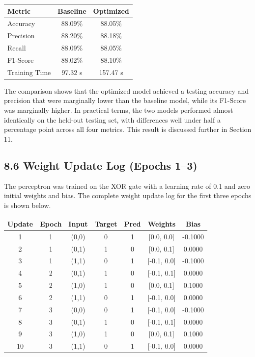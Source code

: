 \documentclass[11pt,a4paper]{article}
\begin{document}
\begin{center}
\begin{tabular}{|p{4cm}|c|c|}
\hline
\textbf{Metric} & \textbf{Baseline} & \textbf{Optimized}\\
\hline
Accuracy & 88.09\% & 88.05\%\\
\hline
Precision & 88.20\% & 88.18\%\\
\hline
Recall & 88.09\% & 88.05\%\\
\hline
F1-Score & 88.02\% & 88.10\%\\
\hline
Training Time & 97.32 s & 157.47 s\\
\hline
\end{tabular}
\end{center}

\vspace{0.15cm}

The comparison shows that the optimized model achieved a testing accuracy and precision that were marginally lower than the baseline model, while its F1-Score was marginally higher. In practical terms, the two models performed almost identically on the held-out testing set, with differences well under half a percentage point across all four metrics. This result is discussed further in Section 11.






\newpage

\subsection*{8.6 Weight Update Log (Epochs 1--3)}

The perceptron was trained on the XOR gate with a learning rate of 0.1 and zero initial weights and bias. The complete weight update log for the first three epochs is shown below.

\begin{center}
\begin{tabular}{|c|c|c|c|c|c|c|}
\hline
\textbf{Update} & \textbf{Epoch} & \textbf{Input} & \textbf{Target} & \textbf{Pred} & \textbf{Weights} & \textbf{Bias}\\
\hline
1 & 1 & (0,0) & 0 & 1 & [0.0, 0.0] & -0.1000\\
\hline
2 & 1 & (0,1) & 1 & 0 & [0.0, 0.1] & 0.0000\\
\hline
3 & 1 & (1,1) & 0 & 1 & [-0.1, 0.0] & -0.1000\\
\hline
4 & 2 & (0,1) & 1 & 0 & [-0.1, 0.1] & 0.0000\\
\hline
5 & 2 & (1,0) & 1 & 0 & [0.0, 0.1] & 0.1000\\
\hline
6 & 2 & (1,1) & 0 & 1 & [-0.1, 0.0] & 0.0000\\
\hline
7 & 3 & (0,0) & 0 & 1 & [-0.1, 0.0] & -0.1000\\
\hline
8 & 3 & (0,1) & 1 & 0 & [-0.1, 0.1] & 0.0000\\
\hline
9 & 3 & (1,0) & 1 & 0 & [0.0, 0.1] & 0.1000\\
\hline
10 & 3 & (1,1) & 0 & 1 & [-0.1, 0.0] & 0.0000\\
\hline
\end{tabular}
\end{center}
\end{document}
